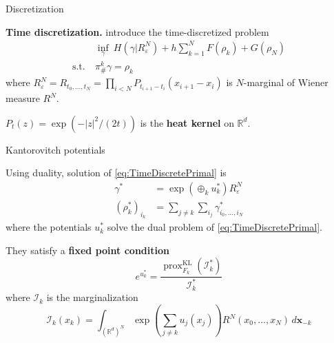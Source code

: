 \documentclass[xcolor={dvipsnames}]{beamer}
\newcommand{\RR}{\mathbb{R}}
\newcommand{\calI}{\mathcal{I}}
\newcommand{\suchthat}{\mathrm{s.t.}}
\renewcommand{\epsilon}{\varepsilon}
\DeclareMathOperator{\KL}{KL}
\DeclareMathOperator{\prox}{prox}
\begin{document}
\begin{frame}{Discretization}
	
	\textbf{Time discretization.} \citeauthor{benamou2018entropy} introduce the time-discretized problem
	\begin{subequations}\label{eq:TimeDiscretePrimal}
	\begin{align}
		&\inf_\gamma~
		H(\gamma | R^N_\epsilon) +
		h \sum_{k=1}^{N} F(\rho_k) +
		G(\rho_N)  \\
		\suchthat\ & \pi^k_\#\gamma = \rho_k
	\end{align}
	\end{subequations}
	where $R^N_\epsilon = R_{t_0,\ldots,t_N} = \prod_{i<N} P_{t_{i+1}-t_i}(x_{i+1}-x_i)$ is $N$-marginal of Wiener measure $R^N$.
	
	$P_t(z) = \exp(-|z|^2/(2t))$ is the \textbf{heat kernel} on $\RR^d$.
	
\end{frame}

\begin{frame}[allowframebreaks]{Kantorovitch potentials}
	
	Using duality, solution of \eqref{eq:TimeDiscretePrimal} is
	\begin{align*}
		\gamma^* &= \exp(\oplus_k u^*_k) R^N_\epsilon  \\
		(\rho_k^*)_{i_k} &= \sum_{j\neq k}\sum_{i_j} \gamma^*_{i_0,\ldots,i_N}
	\end{align*}
	where the potentials $u^*_k$ solve the dual problem of \eqref{eq:TimeDiscretePrimal}.
	
	\framebreak
	
	They satisfy a \textbf{fixed point condition}
	\begin{equation}
		e^{u^*_k} = \frac{
			\prox^{\KL}_{F_k}(\calI_k^*)
		}{
			\calI_k^*
		}
	\end{equation}
	where $\calI_k$ is the marginalization
	\begin{equation*}
		\calI_k(x_k) = \int_{(\RR^d)^N}
		\exp\left(\sum_{j\neq k} u_j(x_j) \right) R^N(x_0,\ldots,x_N)\, d\boldsymbol{x}_{-k}
	\end{equation*}
	
	
	
\end{frame}
\end{document}
